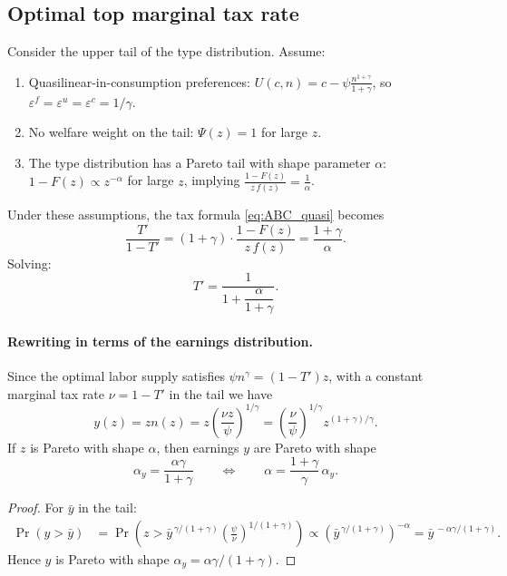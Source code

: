 \documentclass[12pt,a4paper]{article}
\theoremstyle{definition}
\theoremstyle{plain}
\theoremstyle{remark}
\begin{document}
\subsection{Optimal top marginal tax rate}

Consider the upper tail of the type distribution. Assume:
\begin{enumerate}[label=(\alph*)]
  \item Quasilinear-in-consumption preferences: $U(c,n) = c - \psi \frac{n^{1+\gamma}}{1+\gamma}$, so $\varepsilon^f = \varepsilon^u = \varepsilon^c = 1/\gamma$.
  \item No welfare weight on the tail: $\Psi(z) = 1$ for large $z$.
  \item The type distribution has a Pareto tail with shape parameter $\alpha$: $1 - F(z) \propto z^{-\alpha}$ for large $z$, implying $\frac{1-F(z)}{z \, f(z)} = \frac{1}{\alpha}$.
\end{enumerate}

Under these assumptions, the tax formula \eqref{eq:ABC_quasi} becomes
\[
  \frac{T'}{1-T'} = (1 + \gamma) \cdot \frac{1 - F(z)}{z \, f(z)} = \frac{1+\gamma}{\alpha}.
\]
Solving:
\begin{equation}
\label{eq:top_rate_z}
  T' = \frac{1}{1 + \dfrac{\alpha}{1+\gamma}}.
\end{equation}

\paragraph{Rewriting in terms of the earnings distribution.} Since the optimal labor supply satisfies $\psi n^\gamma = (1-T')z$, with a constant marginal tax rate $\nu = 1-T'$ in the tail we have
\[
  y(z) = zn(z) = z \left(\frac{\nu z}{\psi}\right)^{1/\gamma}
  = \left(\frac{\nu}{\psi}\right)^{1/\gamma} z^{(1+\gamma)/\gamma}.
\]
If $z$ is Pareto with shape $\alpha$, then earnings $y$ are Pareto with shape
\[
  \alpha_y = \frac{\alpha \gamma}{1+\gamma}
  \qquad \Longleftrightarrow \qquad
  \alpha = \frac{1+\gamma}{\gamma}\,\alpha_y.
\]

\begin{proof}
For $\bar y$ in the tail:
\begin{align*}
  \Pr(y > \bar y) &= \Pr\!\left(z > \bar y^{\,\gamma/(1+\gamma)} \left(\frac{\psi}{\nu}\right)^{1/(1+\gamma)}\right)
  \propto \left(\bar y^{\,\gamma/(1+\gamma)}\right)^{-\alpha} = \bar y^{\,-\alpha\gamma/(1+\gamma)}.
\end{align*}
Hence $y$ is Pareto with shape $\alpha_y = \alpha\gamma/(1+\gamma)$.
\end{proof}
\end{document}
